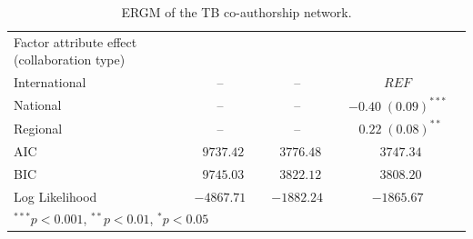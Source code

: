 \begin{table}
\begin{center}
\begin{tabular}{@{}lcclclcl@{}}
Factor attribute effect (collaboration type) &  &    &  &  &   &   \\
\hspace{10pt}International   &  & --   &  & --   &  & $REF$\\
\hspace{10pt}National        & &  --   &  &  -- & & $-0.40 \; (0.09)^{***}$ \\
\hspace{10pt}Regional        & &  --   &  & --  & & $\hspace{6pt}0.22 \; (0.08)^{**}$   \\
\midrule
AIC           &  & $\hspace{6pt}9737.42$  &  & $\hspace{6pt}3776.48$  &  & $\hspace{6pt}3747.34$ \\
BIC           &  & $\hspace{6pt}9745.03$  &  & $\hspace{6pt}3822.12$  &  & $\hspace{6pt}3808.20$ \\
Log Likelihood   &  & $-4867.71$        &  & $-1882.24$         &    & $-1865.67$ \\
\bottomrule
\multicolumn{4}{l}{\scriptsize{$^{***}p<0.001$, $^{**}p<0.01$, $^*p<0.05$}}
\end{tabular}
\caption{ERGM of the TB co-authorship network.}
\label{tab:tb_ergm}
\end{center}
\end{table}

